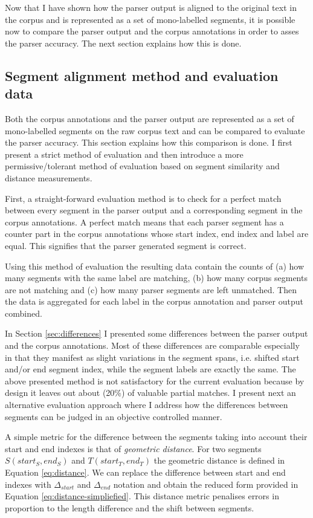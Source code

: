     Now that I have shown how the parser output is aligned to the original text in the corpus and is represented as a set of mono-labelled segments, it is possible now to compare the parser output and the corpus annotations in order to asses the parser accuracy. The next section explains how this is done. 

\subsection{Segment alignment method and evaluation data}
\label{sec:alignment-algorithms}    

    Both the corpus annotations and the parser output are represented as a set of mono-labelled segments on the raw corpus text and can be compared to evaluate the parser accuracy. This section explains how this comparison is done. I first present a strict method of evaluation and then introduce a more permissive/tolerant  method of evaluation based on segment similarity and distance measurements. 

    First, a straight-forward evaluation method is to check for a perfect match between every segment in the parser output and a corresponding segment in the corpus annotations. A perfect match means that each parser segment has a counter part in the corpus annotations whose start index, end index and label are equal. This signifies that the parser generated segment is correct.
    
    Using this method of evaluation the resulting data contain the counts of (a) how many segments with the same label are matching, (b) how many corpus segments are not matching and (c) how many parser segments are left unmatched. Then the data is aggregated for each label in the corpus annotation and parser output combined. 
    
    In Section \ref{sec:differences} I presented some differences between the parser output and the corpus annotations. Most of these differences are comparable especially in that they manifest as slight variations in the segment spans, i.e. shifted start and/or end segment index, while the segment labels are exactly the same. The above presented method is not satisfactory for the current evaluation because by design it leaves out about (20\%) of valuable partial matches. I present next an alternative evaluation approach where I address how the differences between segments can be judged in an objective controlled manner.
    
    A simple metric for the difference between the segments taking into account their start and end indexes is that of \textit{geometric distance}. For two segments $S(start_S,end_S)$ and $T(start_T,end_T)$ the geometric distance is defined in Equation \ref{eq:distance}. We can replace the difference between start and end indexes with $\varDelta_{start}$ and $\varDelta_{end}$ notation and obtain the reduced form provided in Equation \ref{eq:distance-simpliefied}. This distance metric penalises errors in proportion to the length difference and the shift between segments. 
    
